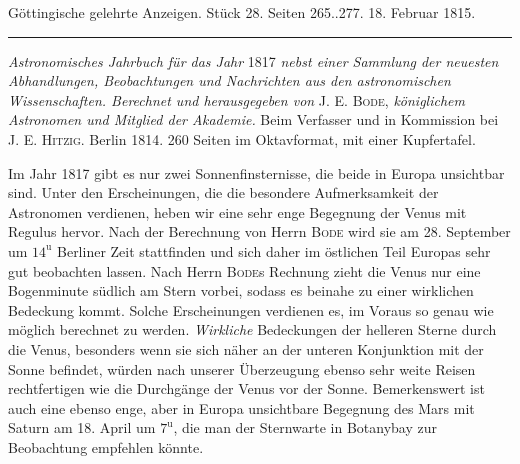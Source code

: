 \clearpage
{}
\hypertarget{native-581-lower}{}
\begin{center}\small Göttingische gelehrte Anzeigen. Stück 28. Seiten 265..277. 18. Februar 1815.\\[3pt]\rule{.72\linewidth}{.3pt}\end{center}

\emph{Astronomisches Jahrbuch für das Jahr} 1817 \emph{nebst einer Sammlung der neuesten Abhandlungen, Beobachtungen und Nachrichten aus den astronomischen Wissenschaften. Berechnet und herausgegeben von} J. E. \textsc{Bode}, \emph{königlichem Astronomen und Mitglied der Akademie.} Beim Verfasser und in Kommission bei J. E. \textsc{Hitzig}. Berlin 1814. 260 Seiten im Oktavformat, mit einer Kupfertafel.

Im Jahr 1817 gibt es nur zwei Sonnenfinsternisse, die beide in Europa unsichtbar sind. Unter den Erscheinungen, die die besondere Aufmerksamkeit der Astronomen verdienen, heben wir eine sehr enge Begegnung der Venus mit Regulus hervor. Nach der Berechnung von Herrn \textsc{Bode} wird sie am 28. September um $14^{\mathrm{u}}$ Berliner Zeit stattfinden und sich daher im östlichen Teil Europas sehr gut beobachten lassen. Nach Herrn \textsc{Bode}s Rechnung zieht die Venus nur eine Bogenminute südlich am Stern vorbei, sodass es beinahe zu einer wirklichen Bedeckung kommt. Solche Erscheinungen verdienen es, im Voraus so genau wie möglich berechnet zu werden. \emph{Wirkliche} Bedeckungen der helleren Sterne durch die Venus, besonders wenn sie sich näher an der unteren Konjunktion mit der Sonne befindet, würden nach unserer Überzeugung ebenso sehr weite Reisen rechtfertigen wie die Durchgänge der Venus vor der Sonne. Bemerkenswert ist auch eine ebenso enge, aber in Europa unsichtbare Begegnung des Mars mit Saturn am 18. April um $7^{\mathrm{u}}$, die man der Sternwarte in Botanybay zur Beobachtung empfehlen könnte.

